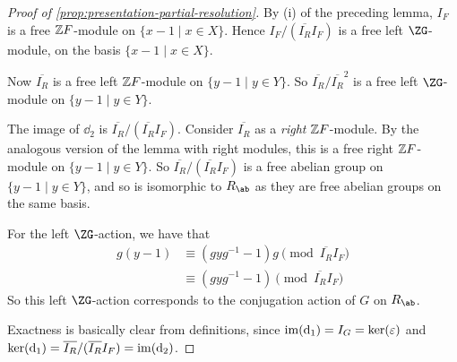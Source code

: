 \documentclass{article}
\begin{document}
\begin{proof}
    [Proof of \cref{prop:presentation-partial-resolution}] By (i) of the preceding lemma, \(I_F\) is a free \(\mathbb{Z} F\)-module on \(\{x - 1 \mid x \in X\}\). Hence \(I_F/(\overline{I_R}I_F)\) is a free left \(\ZG\)-module, on the basis \(\{x - 1 \mid x \in X\}\).

    Now \(\overline{I_R}\) is a free left \(\mathbb{Z} F\)-module on \(\{y - 1 \mid y \in Y\}\). So
    \(\overline{I_R}/\overline{I_R}^2\) is a free left \(\ZG\)-module on \(\{y - 1 \mid y \in Y\}\).

    The image of \(\dd_2\) is \(\overline{I_R}/(\overline{I_R}I_F)\). Consider \(\overline{I_R}\) as a \emph{right} \(\mathbb{Z} F\)-module. By the analogous version of the lemma with right modules, this is a free right \(\mathbb{Z} F\)-module on \(\{y - 1 \mid y \in Y\}\). So
    \(\overline{I_R}/(\overline{I_R}I_F)\) is a free abelian group on \(\{y - 1 \mid y \in Y\}\), and so is isomorphic to \(R_\ab\) as they are free abelian groups on the same basis.

    For the left \(\ZG\)-action, we have that
    \begin{align*}
        g(y - 1) &\equiv (gyg^{-1} - 1)g \pmod {\overline{I_R}I_F} \\
        &\equiv (gyg^{-1} - 1) \pmod {\overline{I_R}I_F}
    \end{align*}
    So this left \(\ZG\)-action corresponds to the conjugation action of \(G\) on \(R_\ab\).

    Exactness is basically clear from definitions, since \(\operatorname{im}(\dd_1) = I_G = \ker(\varepsilon)\) and \(\ker(\dd_1) = \overline{I_R}/(\overline{I_R}I_F) = \operatorname{im}(\dd_2)\).
\end{proof}

\lec
\end{document}
